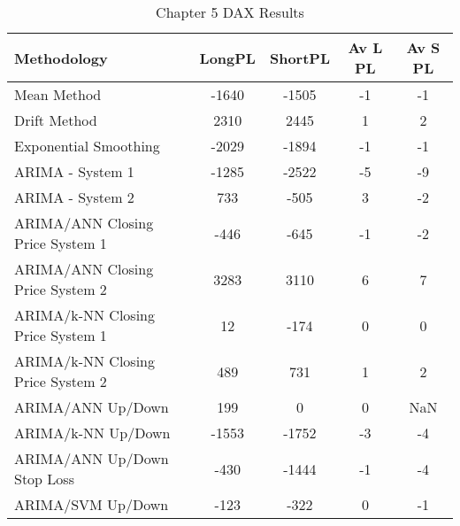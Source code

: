 \begin{table}[ht]
\centering
\caption[Chapter 5 DAX Results]{Chapter 5 DAX Results} 
\label{tab:chp6:dax2_summary}
\begin{tabular}{lcccc}
  \toprule Methodology & LongPL & ShortPL & Av L PL & Av S PL \\ 
  \midrule Mean Method & -1640 & -1505 & -1 & -1 \\ 
  Drift Method & 2310 & 2445 & 1 & 2 \\ 
  Exponential Smoothing & -2029 & -1894 & -1 & -1 \\ 
  ARIMA - System 1 & -1285 & -2522 & -5 & -9 \\ 
  ARIMA - System 2 & 733 & -505 & 3 & -2 \\ 
  ARIMA/ANN Closing Price System 1 & -446 & -645 & -1 & -2 \\ 
  ARIMA/ANN Closing Price System 2 & 3283 & 3110 & 6 & 7 \\ 
  ARIMA/k-NN Closing Price System 1 & 12 & -174 & 0 & 0 \\ 
  ARIMA/k-NN Closing Price System 2 & 489 & 731 & 1 & 2 \\ 
  ARIMA/ANN Up/Down & 199 & 0 & 0 & NaN \\ 
  ARIMA/k-NN Up/Down & -1553 & -1752 & -3 & -4 \\ 
  ARIMA/ANN Up/Down Stop Loss & -430 & -1444 & -1 & -4 \\ 
  ARIMA/SVM Up/Down & -123 & -322 & 0 & -1 \\ 
   \bottomrule \end{tabular}
\end{table}
